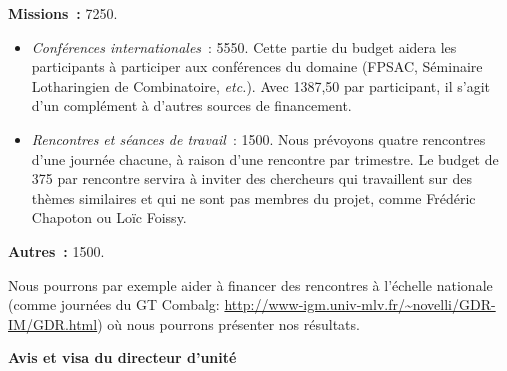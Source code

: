 \documentclass[10pt,reqno]{amsart}
\numberwithin{equation}{subsection}
\begin{document}
{\bf Missions~:} 7250\texteuro.
\begin{itemize}[fullwidth]
    \item {\em Conférences internationales}~: 5550\texteuro.
    Cette partie du budget aidera les participants à participer aux
    conférences du domaine (FPSAC, Séminaire Lotharingien de
    Combinatoire, {\em etc.}). Avec 1387,50\texteuro{} par participant,
    il s'agit d'un complément à d'autres sources de financement.

    \item {\em Rencontres et séances de travail}~: 1500\texteuro.
    Nous prévoyons quatre
    rencontres d'une journée chacune, à raison d'une rencontre par
    trimestre. 
    Le budget
    de 375\texteuro{} par rencontre servira à inviter des chercheurs
    qui travaillent sur des thèmes similaires et qui ne sont pas
    membres du projet, comme Frédéric Chapoton ou Loïc Foissy.
\end{itemize}

{\bf Autres~:} 1500\texteuro.

Nous pourrons par exemple aider à financer des rencontres 
à l'échelle nationale (comme journées du GT Combalg:
\url{http://www-igm.univ-mlv.fr/~novelli/GDR-IM/GDR.html}) où 
nous pourrons présenter nos résultats.




\bigskip

\Large{\bf{Avis et visa du directeur d’unité}}
\bigskip
\end{document}
